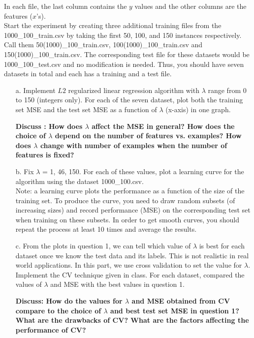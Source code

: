 \documentclass[11pt]{article}
\begin{document}
\noindent In each file, the last column contains the $y$ values and the other columns are the features ($x$'s). \\

\noindent Start the experiment by creating three additional training files from the 1000\_100\_train.csv by taking the first 50, 100, and 150 instances respectively. Call them 50(1000)\_100\_train.csv, 100(1000)\_100\_train.csv and 150(1000)\_100\_train.csv. The corresponding test file for these datasets would be 1000\_100\_test.csv and no modification is needed. Thus, you should have seven datasets in total and each has a training and a test file.\\

\begin{itemize}
\vspace{-5mm}
\item[a.]  Implement $L2$ regularized linear regression algorithm with $\lambda$ range from 0 to 150 (integers only). For each of the seven dataset, plot both the training set MSE and the test set MSE as a function of $\lambda$ (x-axis) in one graph. 

\vspace{2mm}
{\bf{Discuss : How does $\lambda$ affect the MSE in general? How does the choice of $\lambda$ depend on the number of features vs. examples?  How does $\lambda$ change with number of examples when the number of features is fixed?}}

\item[b.] Fix $\lambda$ = 1, 46, 150. For each of these values, plot a learning curve for the algorithm using the dataset 1000\_100.csv.\\
Note: a learning curve plots the performance as a function of the size of the training set. To produce the curve, you need to draw random subsets (of increasing sizes) and record performance (MSE) on the corresponding test set when training on these subsets.  In order to get smooth curves, you should repeat the process at least 10 times and average the results.

\item[c.] From the plots in question 1,  we can tell which value of $\lambda$ is best for each dataset once we know the test data and its labels. This is not realistic in real world applications. In this part, we use cross validation to set the value for $\lambda$. 
Implement the CV technique given in class. For each dataset, compared the values of $\lambda$ and MSE with the best values in question 1.  

\vspace{2mm}
{\bf{Discuss:  How do the values for $\lambda$ and MSE obtained from CV compare to the choice of $\lambda$ and best test set MSE in question 1? What are the drawbacks of CV? What are the factors affecting the performance of CV?}}




\end{itemize}
\end{document}
